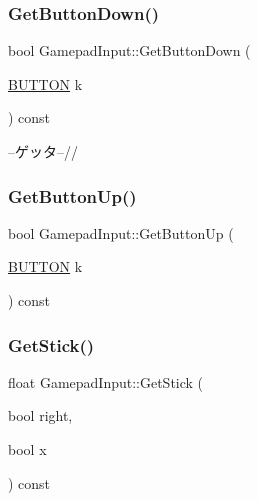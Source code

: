 \mbox{\label{class_gamepad_input_a7e7a0e3d48ce3f91332fd52c4c92bb8f}} 
\subsubsection{\texorpdfstring{Get\+Button\+Down()}{GetButtonDown()}}
{\footnotesize\ttfamily bool Gamepad\+Input\+::\+Get\+Button\+Down (\begin{DoxyParamCaption}\item[{\mbox{\hyperlink{gamepad__input_8h_a739845b0076428add52ca3cec492e705}{B\+U\+T\+T\+ON}}}]{k }\end{DoxyParamCaption}) const\hspace{0.3cm}{\ttfamily [inline]}}



--ゲッタ--// 

\mbox{\label{class_gamepad_input_a2c013028c4e0983a957666ff9922a40c}} 
\subsubsection{\texorpdfstring{Get\+Button\+Up()}{GetButtonUp()}}
{\footnotesize\ttfamily bool Gamepad\+Input\+::\+Get\+Button\+Up (\begin{DoxyParamCaption}\item[{\mbox{\hyperlink{gamepad__input_8h_a739845b0076428add52ca3cec492e705}{B\+U\+T\+T\+ON}}}]{k }\end{DoxyParamCaption}) const\hspace{0.3cm}{\ttfamily [inline]}}

\mbox{\label{class_gamepad_input_ab4d17ae95ad91e106a6a95a4a2976abf}} 
\subsubsection{\texorpdfstring{Get\+Stick()}{GetStick()}}
{\footnotesize\ttfamily float Gamepad\+Input\+::\+Get\+Stick (\begin{DoxyParamCaption}\item[{bool}]{right,  }\item[{bool}]{x }\end{DoxyParamCaption}) const\hspace{0.3cm}{\ttfamily [inline]}}

